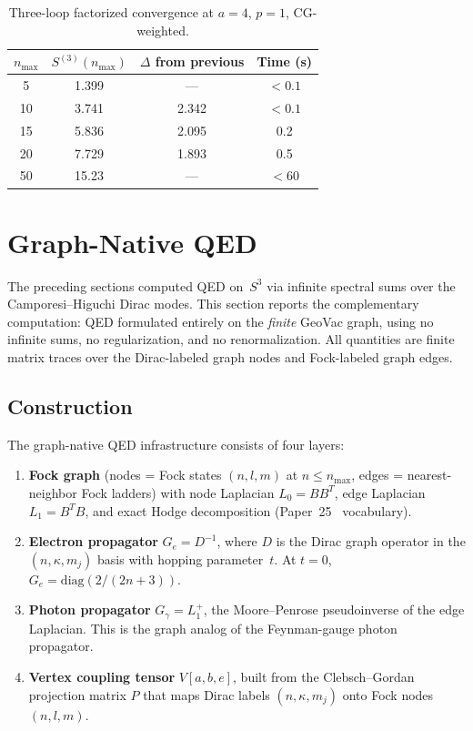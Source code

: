 \documentclass[11pt]{article}
\begin{document}
\begin{table}[h]
\centering
\caption{Three-loop factorized convergence at $a = 4$, $p = 1$, CG-weighted.}
\label{tab:three_loop_convergence}
\begin{tabular}{@{}cccc@{}}
\toprule
$n_{\max}$ & $S^{(3)}(n_{\max})$ & $\Delta$ from previous & Time (s) \\
\midrule
5  & 1.399 & --- & $< 0.1$ \\
10 & 3.741 & 2.342 & $< 0.1$ \\
15 & 5.836 & 2.095 & 0.2 \\
20 & 7.729 & 1.893 & 0.5 \\
50 & 15.23 & --- & $< 60$ \\
\bottomrule
\end{tabular}
\end{table}

\section{Graph-Native QED}
\label{sec:graph_native_qed}

The preceding sections computed QED on~$S^3$ via infinite spectral sums
over the Camporesi--Higuchi Dirac modes.  This section reports the
complementary computation: QED formulated entirely on the \emph{finite}
GeoVac graph, using no infinite sums, no regularization, and no
renormalization.  All quantities are finite matrix traces over the
Dirac-labeled graph nodes and Fock-labeled graph edges.

\subsection{Construction}

The graph-native QED infrastructure consists of four layers:
\begin{enumerate}
\item \textbf{Fock graph} (nodes = Fock states $(n,l,m)$ at $n \le n_{\max}$,
  edges = nearest-neighbor Fock ladders) with node Laplacian $L_0 = BB^T$,
  edge Laplacian $L_1 = B^TB$, and exact Hodge decomposition
  (Paper~25~\cite{paper25} vocabulary).
\item \textbf{Electron propagator} $G_e = D^{-1}$, where $D$ is the
  Dirac graph operator in the $(n, \kappa, m_j)$ basis with hopping
  parameter~$t$.  At $t = 0$, $G_e = \mathrm{diag}(2/(2n+3))$.
\item \textbf{Photon propagator} $G_\gamma = L_1^+$, the
  Moore--Penrose pseudoinverse of the edge Laplacian.  This is the
  graph analog of the Feynman-gauge photon propagator.
\item \textbf{Vertex coupling tensor} $V[a,b,e]$, built from the
  Clebsch--Gordan projection matrix $P$ that maps Dirac labels
  $(n,\kappa,m_j)$ onto Fock nodes $(n,l,m)$.
\end{enumerate}
\end{document}

